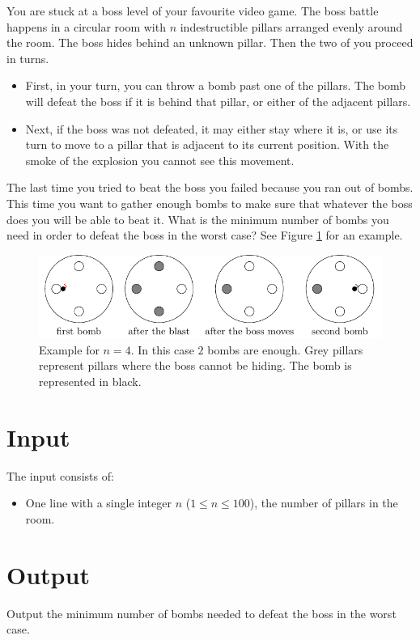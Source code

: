 
You are stuck at a boss level of your favourite video game. The boss battle happens in a circular room with
$n$ indestructible pillars arranged evenly around the room. The boss hides behind an unknown pillar.
Then the two of you proceed in turns.

\begin{itemize}

\item First, in your turn, you can throw a bomb past one of the pillars.
The bomb will defeat the boss if it is behind that pillar, or either of the
adjacent pillars.

\item Next, if the boss was not defeated, it may either stay where it is, or use its
turn to move to a pillar that is adjacent to its current position.
With the smoke of the explosion you cannot see this movement.
\end{itemize}

The last time you tried to beat the boss you failed because you ran out of bombs. This time you
want to gather enough bombs to make sure that whatever the boss does you will be able to beat it.
What is the minimum number of bombs you need in order to defeat the boss in the worst case? See Figure 
\ref{fig:boss} for an example.

\begin{figure}[!h]
\centering
\includegraphics{fig}
\caption{Example for $n=4$. In this case $2$ bombs are enough. Grey pillars represent
pillars where the boss cannot be hiding. The bomb is represented in black.}
\label{fig:boss}
\end{figure}

\section*{Input}

The input consists of:

\begin{itemize}
 \item One line with a single integer $n$ ($1 \leq n \leq 100$), the number of pillars in the room.
\end{itemize}


\section*{Output}

Output the minimum number of bombs needed to defeat the boss in the worst
case.
